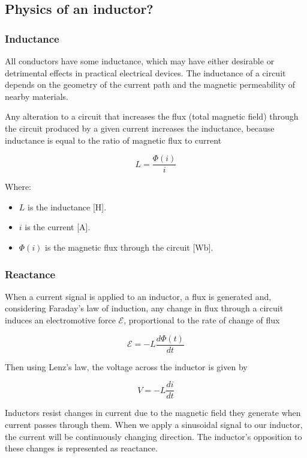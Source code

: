 \subsection{Physics of an inductor?}

\subsubsection{Inductance}
All conductors have some inductance, which may have either desirable or detrimental effects in practical electrical devices. The inductance of a circuit depends on the geometry of the current path and the magnetic permeability of nearby materials.

Any alteration to a circuit that increases the flux (total magnetic field) through the circuit produced by a given current increases the inductance, because inductance is equal to the ratio of magnetic flux to current

\begin{equation}
    L = \frac{\Phi(i)}{i} \label{eq:Inductance_&_flux}
\end{equation}

Where:
\begin{itemize}
    \item $L$ is the inductance [H].
    \item $i$ is the current [A].
    \item $\Phi(i)$ is the magnetic flux through the circuit [Wb].
\end{itemize}    

\subsubsection{Reactance}
When a current signal is applied to an inductor, a flux is generated and, considering Faraday's law of induction, any change in flux through a circuit induces an electromotive force ${\mathcal {E}}$, proportional to the rate of change of flux

\begin{equation}
    {\mathcal {E}} = -L \frac{d\Phi(t)}{dt}
\end{equation}

Then using Lenz's law, the voltage across the inductor is given by

\begin{equation}
    V = -L \frac{di}{dt}
\end{equation}

Inductors resist changes in current due to the magnetic field they generate when current passes through them. When we apply a sinusoidal signal to our inductor, the current will be continuously changing direction. The inductor's opposition to these changes is represented as reactance.


